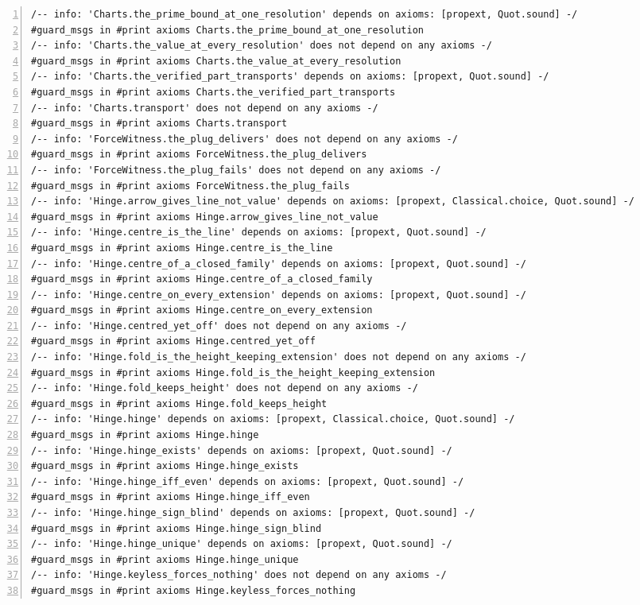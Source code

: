 \documentclass[10pt]{article}
\newcommand{\leansize}{\fontsize{5.5pt}{6.75pt}\selectfont}
\begin{document}
\begin{multicols}{2}
\begin{Verbatim}[numbers=left,firstnumber=1,numbersep=3pt,xleftmargin=2.6em,breaklines=true,breakanywhere=true,breakautoindent=false,breakindent=1.4em,breaksymbolleft={},breakanywheresymbolpre={},fontsize=\leansize]
/-- info: 'Charts.the_prime_bound_at_one_resolution' depends on axioms: [propext, Quot.sound] -/
#guard_msgs in #print axioms Charts.the_prime_bound_at_one_resolution
/-- info: 'Charts.the_value_at_every_resolution' does not depend on any axioms -/
#guard_msgs in #print axioms Charts.the_value_at_every_resolution
/-- info: 'Charts.the_verified_part_transports' depends on axioms: [propext, Quot.sound] -/
#guard_msgs in #print axioms Charts.the_verified_part_transports
/-- info: 'Charts.transport' does not depend on any axioms -/
#guard_msgs in #print axioms Charts.transport
/-- info: 'ForceWitness.the_plug_delivers' does not depend on any axioms -/
#guard_msgs in #print axioms ForceWitness.the_plug_delivers
/-- info: 'ForceWitness.the_plug_fails' does not depend on any axioms -/
#guard_msgs in #print axioms ForceWitness.the_plug_fails
/-- info: 'Hinge.arrow_gives_line_not_value' depends on axioms: [propext, Classical.choice, Quot.sound] -/
#guard_msgs in #print axioms Hinge.arrow_gives_line_not_value
/-- info: 'Hinge.centre_is_the_line' depends on axioms: [propext, Quot.sound] -/
#guard_msgs in #print axioms Hinge.centre_is_the_line
/-- info: 'Hinge.centre_of_a_closed_family' depends on axioms: [propext, Quot.sound] -/
#guard_msgs in #print axioms Hinge.centre_of_a_closed_family
/-- info: 'Hinge.centre_on_every_extension' depends on axioms: [propext, Quot.sound] -/
#guard_msgs in #print axioms Hinge.centre_on_every_extension
/-- info: 'Hinge.centred_yet_off' does not depend on any axioms -/
#guard_msgs in #print axioms Hinge.centred_yet_off
/-- info: 'Hinge.fold_is_the_height_keeping_extension' does not depend on any axioms -/
#guard_msgs in #print axioms Hinge.fold_is_the_height_keeping_extension
/-- info: 'Hinge.fold_keeps_height' does not depend on any axioms -/
#guard_msgs in #print axioms Hinge.fold_keeps_height
/-- info: 'Hinge.hinge' depends on axioms: [propext, Classical.choice, Quot.sound] -/
#guard_msgs in #print axioms Hinge.hinge
/-- info: 'Hinge.hinge_exists' depends on axioms: [propext, Quot.sound] -/
#guard_msgs in #print axioms Hinge.hinge_exists
/-- info: 'Hinge.hinge_iff_even' depends on axioms: [propext, Quot.sound] -/
#guard_msgs in #print axioms Hinge.hinge_iff_even
/-- info: 'Hinge.hinge_sign_blind' depends on axioms: [propext, Quot.sound] -/
#guard_msgs in #print axioms Hinge.hinge_sign_blind
/-- info: 'Hinge.hinge_unique' depends on axioms: [propext, Quot.sound] -/
#guard_msgs in #print axioms Hinge.hinge_unique
/-- info: 'Hinge.keyless_forces_nothing' does not depend on any axioms -/
#guard_msgs in #print axioms Hinge.keyless_forces_nothing

\end{Verbatim}
\end{multicols}
\end{document}
